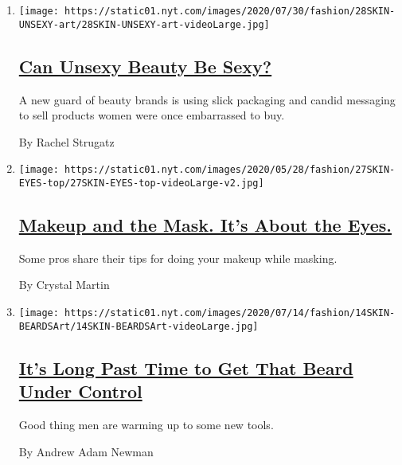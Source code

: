 \begin{enumerate}
\def\labelenumi{\arabic{enumi}.}
\item
  \texttt{[image: https://static01.nyt.com/images/2020/07/30/fashion/28SKIN-UNSEXY-art/28SKIN-UNSEXY-art-videoLarge.jpg]}

  \hypertarget{can-unsexy-beauty-be-sexy-2}{%
  \subsection{\texorpdfstring{\href{/2020/07/28/style/can-unsexy-beauty-be-sexy.html}{Can
  Unsexy Beauty Be
  Sexy?}}{Can Unsexy Beauty Be Sexy?}}\label{can-unsexy-beauty-be-sexy-2}}

  A new guard of beauty brands is using slick packaging and candid
  messaging to sell products women were once embarrassed to buy.

  By Rachel Strugatz
\item
  \texttt{[image: https://static01.nyt.com/images/2020/05/28/fashion/27SKIN-EYES-top/27SKIN-EYES-top-videoLarge-v2.jpg]}

  \hypertarget{makeup-and-the-mask-its-about-the-eyes}{%
  \subsection{\texorpdfstring{\href{/2020/05/26/style/makeup-and-the-mask-its-about-the-eyes.html}{Makeup
  and the Mask. It's About the
  Eyes.}}{Makeup and the Mask. It's About the Eyes.}}\label{makeup-and-the-mask-its-about-the-eyes}}

  Some pros share their tips for doing your makeup while masking.

  By Crystal Martin
\item
  \texttt{[image: https://static01.nyt.com/images/2020/07/14/fashion/14SKIN-BEARDSArt/14SKIN-BEARDSArt-videoLarge.jpg]}

  \hypertarget{its-long-past-time-to-get-that-beard-under-control}{%
  \subsection{\texorpdfstring{\href{/2020/07/15/style/its-long-past-time-to-get-that-beard-under-control.html}{It's
  Long Past Time to Get That Beard Under
  Control}}{It's Long Past Time to Get That Beard Under Control}}\label{its-long-past-time-to-get-that-beard-under-control}}

  Good thing men are warming up to some new tools.

  By Andrew Adam Newman
\end{enumerate}

